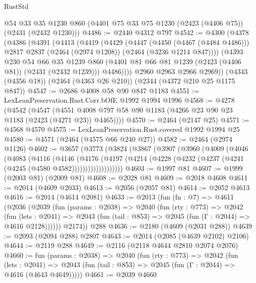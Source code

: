 \begin{lexlean}{RustStd}
\begin{coremodule}
    @54
    @33
    @35
    @1230
    @860
    (@4401 @75 @33 @75 @1230 (@2423 (@4406 @75)) (@2431 (@2432 @1230)))
@4486 := @2440 @4312 @797
@4542 := @4300
    (@4378
      (@4386
        (@4391
          (@4413
            (@4419
              (@4429
                (@4447
                  (@4450 (@4467 (@4484 @4486)))
                  @2817
                  @2837
                  (@2464 (@2974 @1208))
                  (@2464 (@3236 @1214 @847))))
              (@4393
                @230
                @54
                @66
                @35
                @1239
                @860
                (@4401 @81 @66 @81 @1239 (@2423 (@4406 @81)) (@2431 (@2432 @1239)))
                @4486))))
        @2960
        @2963
        @2966
        @2969))
    (@4343 (@4356 @18))
    (@2464 (@4363 @26 @210))
    (@2344 (@4372 @210 @25 @1175 @847))
@4547 := @2686 @4008 @58 @90 @847 @1183
@4551 := LexLeanPreservation.Rust.Corr.bOfE @1992 @1994 @1996
@4568 := @4278
    (@4542
      (@4547 (@4551 @4008 @797 @58 @90 @1183 (@4266 @23 @90 @23 @1183 (@2423 (@4271 @23)) @4465))))
@4570 := @2464 (@2147 @25)
@4571 := @4568 @4570
@4575 := LexLeanPreservation.Rust.covered @1992 @1994 @25
@4580 := @4571 (@2464 (@4575 @66 @240 @27))
@4582 := @2464 (@2974 @1126)
@4602 := @3657
    (@3773
      (@3824
        (@3867
          (@3907
            (@3960
              (@4009
                (@4046
                  (@4083
                    (@4116
                      (@4146
                        (@4176
                          (@4197
                            (@4214
                              (@4228 (@4232 (@4237 (@4241 (@4245 (@4580 @4582)))))))))))))))))))
@4603 := @1997 @81
@4607 := @1999 (@2003 @81) (@2009 @81)
@4608 := @2028 @81
@4609 := @2018 @4608
@4611 := @2014 (@4609 @2033)
@4613 := @2056 (@2057 @81)
@4614 := @2052 @4613
@4616 := @2014 (@4614 @2081)
@4633 := @2013
    (fun (fn : @7) =>
    @4611
      (@2036
        (@2039
          (fun (params : @2038) =>
          @2040
            (fun (rty : @773) =>
            @2042
              (fun (lets : @2041) =>
              @2043 (fun (tail : @853) => @2045 (fun (Γ : @2044) => @4616 @2128))))))
        @2174))
    @288
@4636 := @2180 (@4609 (@2031 @288))
@4639 := @2093 (@2094 @288) @2807
@4643 := @2014 (@2085 (@4639 @2102) @2106)
@4644 := @2119 @288
@4649 := @2116 (@2118 @4644 @2810 @2074 @2076)
@4660 := fun (params : @2038) =>
  @2040
    (fun (rty : @773) =>
    @2042
      (fun (lets : @2041) =>
      @2043 (fun (tail : @853) => @2045 (fun (Γ : @2044) => @4616 (@4643 @4649)))))
@4661 := @2039 @4660

\end{coremodule}
\end{lexlean}
